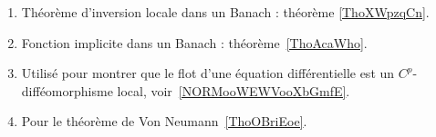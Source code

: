 
\begin{enumerate}
	\item
	      Théorème d'inversion locale dans un Banach : théorème \ref{ThoXWpzqCn}.
	\item
	      Fonction implicite dans un Banach : théorème~\ref{ThoAcaWho}.
	\item
	      Utilisé pour montrer que le flot d'une équation différentielle est un \( C^p\)-difféomorphisme local, voir~\ref{NORMooWEWVooXbGmfE}. %
	\item
	      Pour le théorème de Von Neumann~\ref{ThoOBriEoe}.
\end{enumerate}

